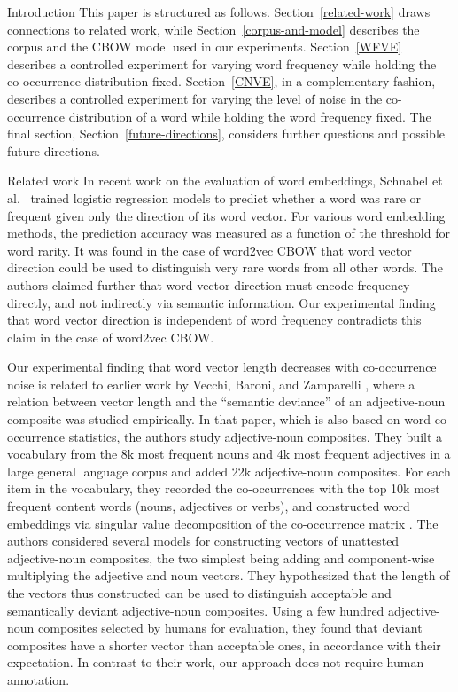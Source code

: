 \documentclass{article} %
\begin{document}
\begin{section}{Introduction}
This paper is structured as follows.  Section~\ref{related-work} draws
connections to related work, while Section~\ref{corpus-and-model} describes
the corpus and the CBOW model used in our experiments.
Section~\ref{WFVE} describes a controlled experiment for varying word
frequency while holding the co-occurrence distribution fixed.
Section~\ref{CNVE}, in a complementary fashion, describes a controlled
experiment for varying the level of noise in the co-occurrence
distribution of a word while holding the word frequency fixed.  The
final section, Section~\ref{future-directions}, considers further questions
and possible future directions.
\end{section}

\begin{section}{Related work}\label{related-work}
In recent work on the evaluation of word embeddings, Schnabel et
al.~\cite{schnabelemnlp2015} trained logistic regression models to
predict whether a word was rare or frequent given only the direction of
its word vector.  For various word embedding methods, the prediction
accuracy was measured as a function of the threshold for word rarity.
It was found in the case of word2vec CBOW that word vector direction
could be used to distinguish very rare words from all other words. The
authors claimed further that word vector direction must encode frequency
directly, and not indirectly via semantic information.  Our experimental
finding that word vector direction is independent of word frequency
contradicts this claim in the case of word2vec CBOW.

Our experimental finding that word vector length decreases with co-occurrence
noise is related to earlier work by Vecchi, Baroni, and Zamparelli
\cite{vecchi-baroni-zamparelli2011}, where a relation between vector length and
the ``semantic deviance'' of an adjective-noun composite was studied
empirically.  In that paper, which is also based on word co-occurrence
statistics, the authors study adjective-noun composites.  They built a
vocabulary from the 8k most frequent nouns and 4k most frequent adjectives in a
large general language corpus and added 22k adjective-noun composites.  For
each item in the vocabulary, they recorded the co-occurrences with the top 10k
most frequent content words (nouns, adjectives or verbs), and constructed word
embeddings via singular value decomposition of the co-occurrence matrix
\cite{landauer-dumais1997}.  The authors considered several models for
constructing vectors of unattested adjective-noun composites, the two simplest
being adding and component-wise multiplying the adjective and noun vectors.
They hypothesized that the length of the vectors thus constructed can be used
to distinguish acceptable and semantically deviant adjective-noun composites.
Using a few hundred adjective-noun composites selected by humans for
evaluation, they found that deviant composites have a shorter vector than
acceptable ones, in accordance with their expectation.  In contrast to their
work, our approach does not require human annotation.


\end{section}
\end{document}
